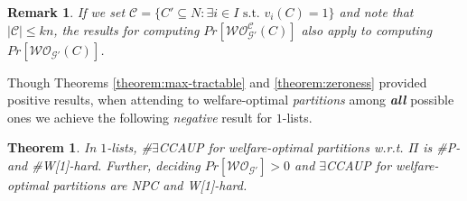 \documentclass[letterpaper]{article} %
\newtheorem{theorem}{Theorem}
\newtheorem{remark}{Remark}
\begin{document}
\begin{remark}
If we set $\mathcal{C} = \{C' \subseteq N : \exists i \in I \text{ s.t. } v_i(C) = 1\}$ and note that $|\mathcal{C}| \leq kn$, the results for computing $Pr[\mathcal{WO}^{\mathcal{C}}_{\mathcal{G}'}(C)]$ also apply to computing $Pr[\mathcal{WO}_{\mathcal{G}'}(C)]$.
\end{remark}


Though Theorems \ref{theorem:max-tractable} and \ref{theorem:zeroness} provided positive results, when attending to welfare-optimal \textit{partitions} among \textbf{\textit{all}} possible ones we achieve the following \textit{negative} result for $1$-lists. 
\begin{theorem}
\label{theorem:max-intractable}
In $1$-lists, \#$\exists$CCAUP for welfare-optimal partitions w.r.t. $\Pi$ is \#P- and \#W[1]-hard. Further, deciding $Pr[\mathcal{WO}_{\mathcal{G}'}] > 0$ and $\exists$CCAUP for welfare-optimal partitions are NPC and W[1]-hard.
\end{theorem}
\end{document}

